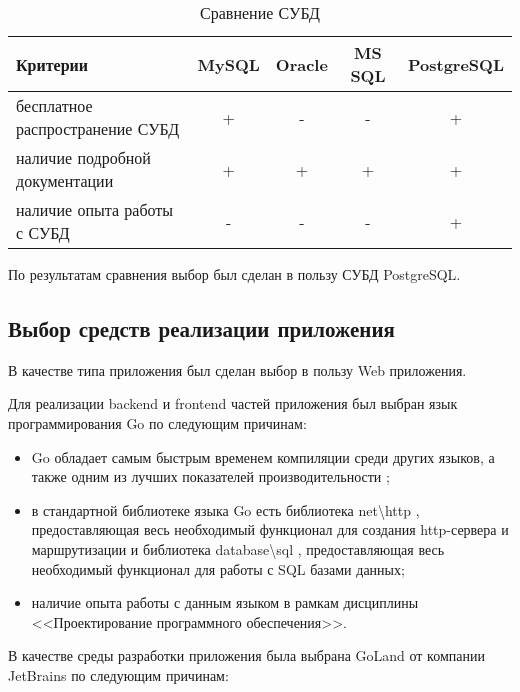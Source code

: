 \begin{table}[H]
	\begin{center}
		\begin{threeparttable}
			\caption{Сравнение СУБД}
			\label{tbl:cmp_dbms}
			\begin{tabular}{|p{7cm}|c|c|c|c|}
				\hline
				\textbf{Критерии} & MySQL & Oracle & MS SQL & PostgreSQL \\
				\hline
				бесплатное распространение СУБД & + & - & - & + \\
				\hline
				наличие подробной документации & + & + & + & + \\
				\hline
				наличие опыта работы с СУБД & - & - & -  & + \\
				\hline
			\end{tabular}
		\end{threeparttable}			
	\end{center}
\end{table}

По результатам сравнения выбор был сделан в пользу СУБД PostgreSQL.

\subsection{Выбор средств реализации приложения}

В качестве типа приложения был сделан выбор в пользу Web приложения.

Для реализации backend и frontend частей приложения был выбран язык программирования Go \cite{info_go} по следующим причинам: 

\begin{itemize}
	\item Go обладает самым быстрым временем компиляции среди других языков, а также одним из лучших показателей производительности \cite{info_cmp_go, info_cmp_go_2};
	\item в стандартной библиотеке языка Go есть библиотека net\textbackslash http \cite{info_go_http_pkg}, предоставляющая весь необходимый функционал для создания http-сервера и маршрутизации и библиотека database\textbackslash sql \cite{info_go_sql_pkg}, предоставляющая весь необходимый функционал для работы с SQL базами данных;
	\item наличие опыта работы с данным языком в рамкам дисциплины <<Проектирование программного обеспечения>>.
\end{itemize}

В качестве среды разработки приложения была выбрана GoLand \cite{info_GoLand} от компании JetBrains \cite{info_JetBrains} по следующим причинам: 

